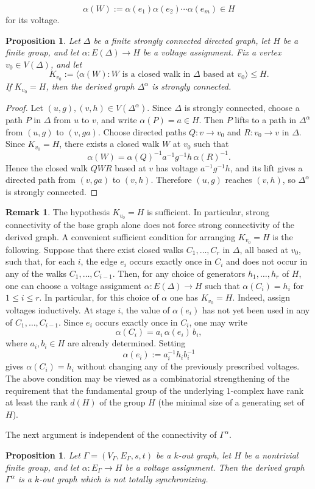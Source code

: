 \documentclass[a4paper,10pt]{amsart}
\theoremstyle{plain}
\newtheorem{proposition}[theorem]{Proposition}
\theoremstyle{definition}
\newtheorem{remark}[theorem]{Remark}
\begin{document}
\[
\alpha(W):=\alpha(e_1)\alpha(e_2)\cdots\alpha(e_m)\in H
\]
for its voltage.
\begin{proposition}\label{prop:strong-connectivity-derived}
Let $\Delta$ be a finite strongly connected directed graph, let $H$ be a finite group, and let $\alpha:E(\Delta)\to H$ be a voltage assignment. Fix a vertex $v_0\in V(\Delta)$, and let
\[
K_{v_0}:=\langle \alpha(W): W \text{ is a closed walk in }\Delta\text{ based at }v_0\rangle\leq H.
\]
If $K_{v_0}=H$, then the derived graph $\Delta^\alpha$ is strongly connected.
\end{proposition}
\begin{proof}
Let $(u,g),(v,h)\in V(\Delta^\alpha)$. Since $\Delta$ is strongly connected, choose a path $P$ in $\Delta$ from $u$ to $v$, and write $\alpha(P)=a\in H$. Then $P$ lifts to a  path in $\Delta^\alpha$ from $(u,g)$ to $(v,ga)$. Choose directed paths $Q:v\to v_0$ and $R:v_0\to v$ in $\Delta$. Since $K_{v_0}=H$, there exists a closed walk $W$ at $v_0$ such that
\[
\alpha(W)=\alpha(Q)^{-1}a^{-1}g^{-1}h\,\alpha(R)^{-1}.
\]
Hence the closed walk $QWR$ based at $v$ has voltage $a^{-1}g^{-1}h$, and its lift gives a directed path from $(v,ga)$ to $(v,h)$. Therefore $(u,g)$ reaches $(v,h)$, so $\Delta^\alpha$ is strongly connected.
\end{proof}
\begin{remark}\label{rem: combinatorial condition}
The hypothesis $K_{v_0}=H$ is sufficient. In particular, strong connectivity of the base graph alone does not force strong connectivity of the derived graph. A convenient sufficient condition for arranging $K_{v_0}=H$ is the following. Suppose that there exist closed walks $C_1,\dots,C_r$ in $\Delta$, all based at $v_0$, such that, for each $i$, the edge $e_i$ occurs exactly once in $C_i$
and does not occur in any of the walks $C_1,\dots,C_{i-1}$. Then, for any choice of generators $h_1,\dots,h_r$ of $H$, one can choose a voltage assignment $\alpha:E(\Delta)\to H$ such that $\alpha(C_i)=h_i$ for $1\le i\le r$. In particular, for this choice of $\alpha$ one has $K_{v_0}=H$. Indeed, assign voltages inductively. At stage $i$, the value of $\alpha(e_i)$ has not yet been used in any of
$C_1,\dots,C_{i-1}$. Since $e_i$ occurs exactly once in $C_i$, one may
write
\[
\alpha(C_i)=a_i\,\alpha(e_i)\,b_i,
\]
where $a_i,b_i\in H$ are already determined. Setting
\[
\alpha(e_i):=a_i^{-1}h_i b_i^{-1}
\]
gives $\alpha(C_i)=h_i$ without changing any of the previously
prescribed voltages.
The above condition may be viewed as a combinatorial strengthening of the requirement that the fundamental group of the underlying $1$-complex have rank at least the rank $d(H)$ of the group $H$ (the minimal size of a generating set of $H$).
\end{remark}
The next argument is independent of the connectivity of $\Gamma^\alpha$.
\begin{proposition}\label{prop:derived-k-out-not-ts}
Let $\Gamma=(V_\Gamma,E_\Gamma,s,t)$ be a $k$-out graph, let $H$ be a nontrivial finite group, and let $\alpha:E_\Gamma\to H$ be a voltage assignment. Then the derived graph $\Gamma^\alpha$ is a $k$-out graph which is not totally synchronizing.
\end{proposition}
\end{document}
